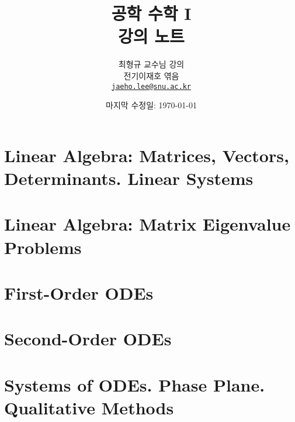 \documentclass[
    oneside,
    a4paper,
    adjustmath,
    itemph,
    nonfrench,
    11pt,
]{oblivoir}
\title{공학 수학 I\\강의 노트}
\author{최형규 교수님 강의\vspace{0.3cm}\\전기\textperiodcentered정보공학부 이재호 엮음\\\href{mailto:jaeho.lee@snu.ac.kr}{\texttt{jaeho.lee@snu.ac.kr}}}
\date{마지막 수정일: \today}
\theoremstyle{definition}
\theoremstyle{plain}
\theoremstyle{plain}
\theoremstyle{remark}
\theoremstyle{remark}
\theoremstyle{remark}
\begin{document}
\maketitle

\setcounter{section}{6}
\reversemarginpar{}
\section{Linear Algebra: Matrices, Vectors, Determinants. Linear Systems}


\section{Linear Algebra: Matrix Eigenvalue Problems}


\setcounter{section}{0}
\section{First-Order ODEs}


\section{Second-Order ODEs}


\setcounter{section}{3}
\section{Systems of ODEs. Phase Plane. Qualitative Methods}

\end{document}
